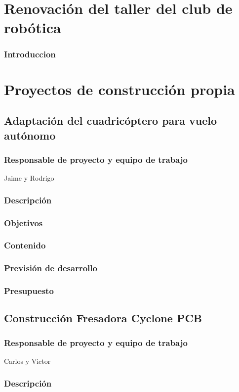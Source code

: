 \documentclass[12pt,twoside]{report}
\begin{document}
\section{Renovación del taller del club de robótica}
\subsubsection{Introduccion}

\section{Proyectos de construcción propia}

\subsection{Adaptación del cuadricóptero para vuelo autónomo}
\subsubsection{Responsable de proyecto y equipo de trabajo}
Jaime y Rodrigo
\subsubsection{Descripción}
\subsubsection{Objetivos}
\subsubsection{Contenido}
\subsubsection{Previsión de desarrollo}
\subsubsection{Presupuesto}


\subsection{Construcción Fresadora Cyclone PCB}
\subsubsection{Responsable de proyecto y equipo de trabajo}
Carlos y Victor
\subsubsection{Descripción}
\end{document}
